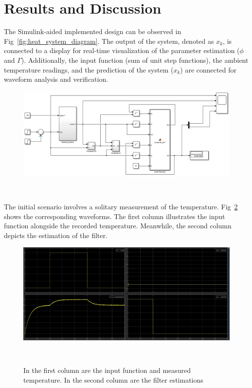 \section{Results and Discussion}
The Simulink-aided implemented design can be observed in Fig~\ref{fig:heat_system_diagram}. The output of the system, denoted as $x_{k}$, is connected to a display for real-time visualization of the parameter estimation ($\phi$ and $\Gamma$). Additionally, the input function (sum of unit step functions), the ambient temperature readings, and the prediction of the system ($x_{k}$) are connected for waveform analysis and verification.

\begin{figure}[H]
\centering
\includegraphics[width=1\linewidth]{figures/simulink_system.png}
\caption{}
~\label{fig:simulink_system}
\end{figure}

The initial scenario involves a solitary measurement of the temperature. Fig~\ref{fig:simulink_plot} shows the corresponding waveforms. The first column illustrates the input function alongside the recorded temperature. Meanwhile, the second column depicts the estimation of the filter.

\begin{figure}[H]
\centering
\includegraphics[width=1\linewidth]{figures/simulink_plot.png}
\caption{In the first column are the input function and measured temperature. In the second column are the filter estimations}
~\label{fig:simulink_plot}
\end{figure}

